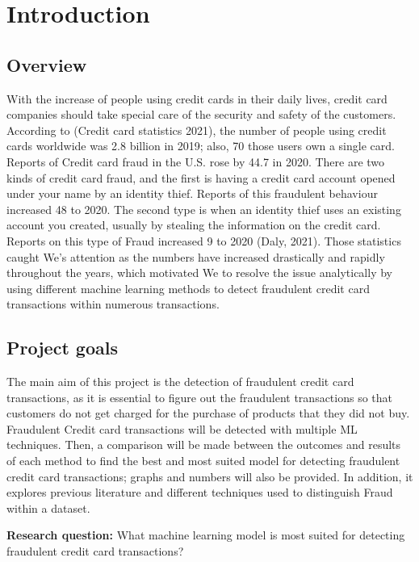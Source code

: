 \chapter{Introduction}

\section{Overview}
With the increase of people using credit cards in their daily lives, credit card companies should 
take special care of the security and safety of the customers. According to (Credit card statistics 
2021), the number of people using credit cards worldwide was 2.8 billion in 2019; also, 70%
those users own a single card.
Reports of Credit card fraud in the U.S. rose by 44.7%
in 2020. There are two kinds of credit card fraud, and the first is having a credit card account opened 
under your name by an identity thief. Reports of this fraudulent behaviour increased 48%
to 2020. The second type is when an identity thief uses an existing account you created, usually by 
stealing the information on the credit card. Reports on this type of Fraud increased 9%
to 2020 (Daly, 2021). Those statistics caught  We's attention as the numbers have  increased 
drastically and rapidly throughout the years, which motivated We to resolve the issue analytically 
by using different machine learning methods to detect fraudulent credit card transactions within 
numerous transactions.








\section{ Project goals}
The main aim of this project is the detection of fraudulent credit card transactions, as it is 
essential to figure out the fraudulent transactions so that customers do not get charged for the 
purchase of products that they did not buy. Fraudulent Credit card transactions will be detected 
with multiple ML techniques. Then, a comparison will be made between the outcomes and results 
of each method to find the best and most suited model for detecting fraudulent credit card 
transactions; graphs and numbers will also be provided. In addition, it explores previous literature 
and different techniques used to distinguish Fraud within a dataset.

\textbf{Research question: } What machine learning model is most suited for detecting fraudulent credit 
card transactions?




